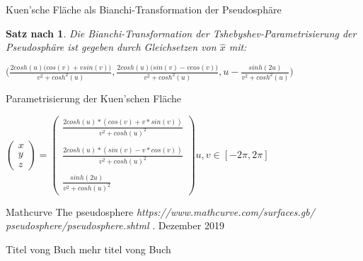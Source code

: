 \documentclass[12pt]{beamer}
\newtheorem{mythm}{Satz nach \cite{gray}}
\begin{document}
\begin{frame}{Kuen'sche Fläche als Bianchi-Transformation der Pseudosphäre}
\begin{mythm}
Die Bianchi-Transformation der Tshebyshev-Parametrisierung der Pseudosphäre ist gegeben durch Gleichsetzen von $\hat{x}$ mit:
\begin{center}
$\Big(\frac{2cosh(u)\big(cos(v) + v sin(v)\big)}{v^2 + cosh^2(u)}, \frac{2cosh(u)\big(sin(v) - v cos(v)\big)}{v^2 + cosh^2(u)}, u - \frac{sinh(2u)}{v^2 + cosh^2(u)}\Big)$
\end{center}
\end{mythm}
\end{frame}

\begin{frame}{Parametrisierung der Kuen'schen Fläche}

\begin{center}
$
\begin{pmatrix}
x\\y\\z
\end{pmatrix}
 =
\begin{pmatrix}
\frac{2cosh(u)* \left( cos(v) + v*sin(v) \right)}{v^2+cosh(u)^2}\\\\
\frac{2cosh(u)*(sin(v) - v*cos(v))}{v^2 + cosh(u)^2}\\\\
\frac{sinh(2u)}{v^2 + cosh(u)^2}
\end{pmatrix}
u,v \in \left[ -2\pi , 2\pi \right] $
\end{center}

\end{frame}

\begin{frame}

\footnotesize{
\begin{thebibliography}{99}

 Mathcurve
\newblock The pseudosphere
\newblock \emph{https://www.mathcurve.com/surfaces.gb/\\pseudosphere/pseudosphere.shtml}
. Dezember 2019

 Titel vong Buch
\newblock mehr titel vong Buch

\end{thebibliography}
}

\end{frame}
\end{document}
